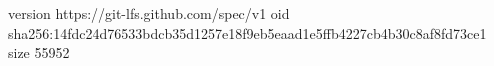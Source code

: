 version https://git-lfs.github.com/spec/v1
oid sha256:14fdc24d76533bdcb35d1257e18f9eb5eaad1e5ffb4227cb4b30c8af8fd73ce1
size 55952
